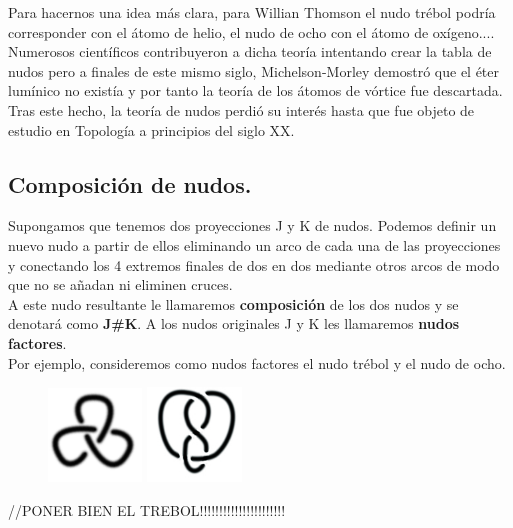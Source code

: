 \documentclass[14pt]{extarticle}
\begin{document}
Para hacernos una idea más clara, para Willian Thomson el nudo trébol podría corresponder con el átomo de helio, el nudo de ocho con el átomo de oxígeno....\\

Numerosos científicos contribuyeron a dicha teoría intentando crear la tabla de nudos pero a finales de este mismo siglo, Michelson-Morley demostró que el éter lumínico no existía y por tanto la teoría de los átomos de vórtice fue descartada. \\

Tras este hecho, la teoría de nudos perdió su interés hasta que fue objeto de estudio en Topología a principios del siglo XX.


\newpage
\subsection{Composición de nudos.}
Supongamos que tenemos dos proyecciones J y K de nudos. Podemos definir un nuevo nudo a partir de ellos eliminando un arco de cada una de las proyecciones y conectando los 4 extremos finales de dos en dos mediante otros arcos de modo que no se añadan ni eliminen cruces.\\
A este nudo resultante le llamaremos \textbf{composición} de los dos nudos y se denotará como \textbf{J\#K}. A los nudos originales J y K les llamaremos \textbf{nudos factores}. \\

Por ejemplo, consideremos como nudos factores el nudo trébol y el nudo de ocho. 
  \begin{figure}[h!]
  	\includegraphics[width=2.5cm]{3f.png} 
  	\includegraphics[width=2.5cm]{fig8.jpg}
  	\centering
  	\label{comp1} 
  \end{figure}
  
  //PONER BIEN EL TREBOL!!!!!!!!!!!!!!!!!!!!!!
  
\end{document}
